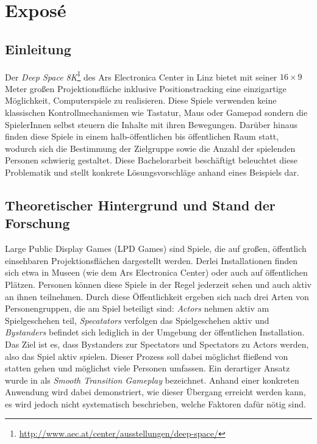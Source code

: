 \chapter{Exposé}

\section{Einleitung}

Der \emph{Deep Space 8K}\footnote{\url{http://www.aec.at/center/ausstellungen/deep-space/}} des Ars Electronica Center in Linz bietet mit seiner $16 \times 9$ Meter großen Projektionsfläche inklusive Positionstracking eine einzigartige Möglichkeit, Computerspiele zu realisieren. Diese Spiele verwenden keine klassischen Kontrollmechanismen wie Tastatur, Maus oder Gamepad sondern die SpielerInnen selbst steuern die Inhalte mit ihren Bewegungen. Darüber hinaus finden diese Spiele in einem halb-öffentlichen bis öffentlichen Raum statt, wodurch sich die Bestimmung der Zielgruppe sowie die Anzahl der spielenden Personen schwierig gestaltet. Diese Bachelorarbeit beschäftigt beleuchtet diese Problematik und stellt konkrete Lösungsvorschläge anhand eines Beispiels dar.

\section{Theoretischer Hintergrund und Stand der Forschung}

Large Public Display Games (LPD Games) sind Spiele, die auf großen, öffentlich einsehbaren Projektionsflächen dargestellt werden. Derlei Installationen finden sich etwa in Museen (wie dem Ars Electronica Center) oder auch auf öffentlichen Plätzen. Personen können diese Spiele in der Regel jederzeit sehen und auch aktiv an ihnen teilnehmen. Durch diese Öffentlichkeit ergeben sich nach \cite{Finke2008} drei Arten von Personengruppen, die am Spiel beteiligt sind: \emph{Actors} nehmen aktiv am Spielgeschehen teil, \emph{Specatators} verfolgen das Spielgeschehen aktiv und \emph{Bystanders} befindet sich lediglich in der Umgebung der öffentlichen Installation. Das Ziel ist es, dass Bystanders zur Spectators und Spectators zu Actors werden, also das Spiel aktiv spielen. Dieser Prozess soll dabei möglichst fließend von statten gehen und möglichst viele Personen umfassen. Ein derartiger Ansatz wurde in \cite{Hochleitner2013} als \emph{Smooth Transition Gameplay} bezeichnet. Anhand einer konkreten Anwendung wird dabei demonstriert, wie dieser Übergang erreicht werden kann, es wird jedoch nicht systematisch beschrieben, welche Faktoren dafür nötig sind.

